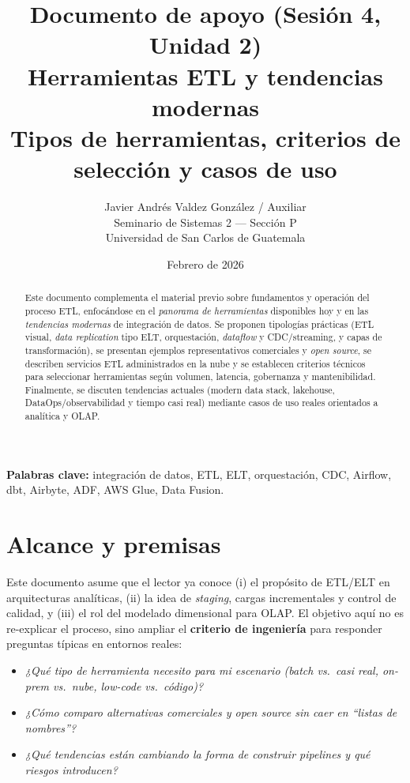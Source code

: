 \documentclass[12pt]{article}
\title{\textbf{Documento de apoyo (Sesión 4, Unidad 2)}\\
\large Herramientas ETL y tendencias modernas\\
\normalsize Tipos de herramientas, criterios de selección y casos de uso}
\author{Javier Andrés Valdez González / Auxiliar \\
\small Seminario de Sistemas 2 — Sección P \\
\small Universidad de San Carlos de Guatemala}
\date{Febrero de 2026}
\begin{document}
\maketitle

\begin{abstract}
Este documento complementa el material previo sobre fundamentos y operación del proceso ETL, enfocándose en el \textit{panorama de herramientas} disponibles hoy y en las \textit{tendencias modernas} de integración de datos. Se proponen tipologías prácticas (ETL visual, \textit{data replication} tipo ELT, orquestación, \textit{dataflow} y CDC/streaming, y capas de transformación), se presentan ejemplos representativos comerciales y \textit{open source}, se describen servicios ETL administrados en la nube y se establecen criterios técnicos para seleccionar herramientas según volumen, latencia, gobernanza y mantenibilidad. Finalmente, se discuten tendencias actuales (modern data stack, lakehouse, DataOps/observabilidad y tiempo casi real) mediante casos de uso reales orientados a analítica y OLAP.
\end{abstract}

\textbf{Palabras clave:} integración de datos, ETL, ELT, orquestación, CDC, Airflow, dbt, Airbyte, ADF, AWS Glue, Data Fusion.

\newpage
\tableofcontents

\section{Alcance y premisas}
Este documento asume que el lector ya conoce (i) el propósito de ETL/ELT en arquitecturas analíticas, (ii) la idea de \textit{staging}, cargas incrementales y control de calidad, y (iii) el rol del modelado dimensional para OLAP. El objetivo aquí no es re-explicar el proceso, sino ampliar el \textbf{criterio de ingeniería} para responder preguntas típicas en entornos reales:

\begin{itemize}[leftmargin=*]
  \item \textit{¿Qué tipo de herramienta necesito para mi escenario (batch vs.\ casi real, on-prem vs.\ nube, low-code vs.\ código)?}
  \item \textit{¿Cómo comparo alternativas comerciales y open source sin caer en “listas de nombres”?}
  \item \textit{¿Qué tendencias están cambiando la forma de construir pipelines y qué riesgos introducen?}
\end{itemize}
\end{document}
